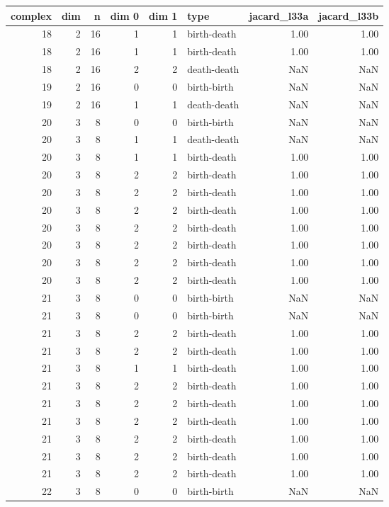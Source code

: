 \documentclass{article}
\begin{document}
\begin{center}
\begin{tabular}{rrrrrlrr}
\toprule
complex & dim & n & dim 0 & dim 1 & type & jacard\_l33a & jacard\_l33b \\
\midrule
18 & 2 & 16 & 1 & 1 & birth-death & 1.00 & 1.00 \\
18 & 2 & 16 & 1 & 1 & birth-death & 1.00 & 1.00 \\
18 & 2 & 16 & 2 & 2 & death-death & NaN & NaN \\
19 & 2 & 16 & 0 & 0 & birth-birth & NaN & NaN \\
19 & 2 & 16 & 1 & 1 & death-death & NaN & NaN \\
20 & 3 & 8 & 0 & 0 & birth-birth & NaN & NaN \\
20 & 3 & 8 & 1 & 1 & death-death & NaN & NaN \\
20 & 3 & 8 & 1 & 1 & birth-death & 1.00 & 1.00 \\
20 & 3 & 8 & 2 & 2 & birth-death & 1.00 & 1.00 \\
20 & 3 & 8 & 2 & 2 & birth-death & 1.00 & 1.00 \\
20 & 3 & 8 & 2 & 2 & birth-death & 1.00 & 1.00 \\
20 & 3 & 8 & 2 & 2 & birth-death & 1.00 & 1.00 \\
20 & 3 & 8 & 2 & 2 & birth-death & 1.00 & 1.00 \\
20 & 3 & 8 & 2 & 2 & birth-death & 1.00 & 1.00 \\
20 & 3 & 8 & 2 & 2 & birth-death & 1.00 & 1.00 \\
21 & 3 & 8 & 0 & 0 & birth-birth & NaN & NaN \\
21 & 3 & 8 & 0 & 0 & birth-birth & NaN & NaN \\
21 & 3 & 8 & 2 & 2 & birth-death & 1.00 & 1.00 \\
21 & 3 & 8 & 2 & 2 & birth-death & 1.00 & 1.00 \\
21 & 3 & 8 & 1 & 1 & birth-death & 1.00 & 1.00 \\
21 & 3 & 8 & 2 & 2 & birth-death & 1.00 & 1.00 \\
21 & 3 & 8 & 2 & 2 & birth-death & 1.00 & 1.00 \\
21 & 3 & 8 & 2 & 2 & birth-death & 1.00 & 1.00 \\
21 & 3 & 8 & 2 & 2 & birth-death & 1.00 & 1.00 \\
21 & 3 & 8 & 2 & 2 & birth-death & 1.00 & 1.00 \\
21 & 3 & 8 & 2 & 2 & birth-death & 1.00 & 1.00 \\
22 & 3 & 8 & 0 & 0 & birth-birth & NaN & NaN \\

\end{tabular}
\end{center}
\end{document}
